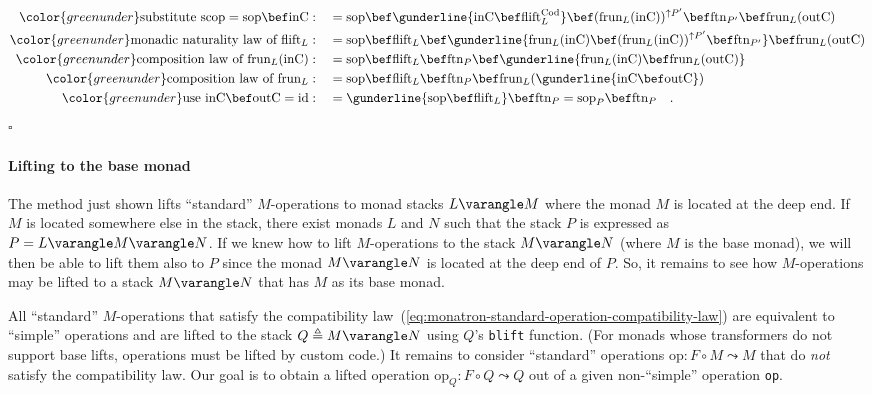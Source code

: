 \begin{align*}
{\color{greenunder}\text{substitute }\text{scop}=\text{sop}\bef\text{inC}:}\quad & =\text{sop}\bef\gunderline{\text{inC}\bef\text{flift}_{L}^{\text{Cod}}}\bef(\text{frun}_{L}(\text{inC}))^{\uparrow P^{\prime}}\bef\text{ftn}_{P^{\prime}}\bef\text{frun}_{L}(\text{outC})\\
{\color{greenunder}\text{monadic naturality law of }\text{flift}_{L}:}\quad & =\text{sop}\bef\text{flift}_{L}\bef\gunderline{\text{frun}_{L}(\text{inC})\bef(\text{frun}_{L}(\text{inC}))^{\uparrow P^{\prime}}\bef\text{ftn}_{P^{\prime}}}\bef\text{frun}_{L}(\text{outC})\\
{\color{greenunder}\text{composition law of }\text{frun}_{L}(\text{inC}):}\quad & =\text{sop}\bef\text{flift}_{L}\bef\text{ftn}_{P}\bef\gunderline{\text{frun}_{L}(\text{inC})\bef\text{frun}_{L}(\text{outC})}\\
{\color{greenunder}\text{composition law of }\text{frun}_{L}:}\quad & =\text{sop}\bef\text{flift}_{L}\bef\text{ftn}_{P}\bef\text{frun}_{L}(\gunderline{\text{inC}\bef\text{outC}})\\
{\color{greenunder}\text{use }\text{inC}\bef\text{outC}=\text{id}:}\quad & =\gunderline{\text{sop}\bef\text{flift}_{L}}\bef\text{ftn}_{P}=\text{sop}_{P}\bef\text{ftn}_{P}\quad.
\end{align*}
$\square$

\paragraph{Lifting to the base monad}

The method just shown lifts \textsf{``}standard\textsf{''} $M$-operations to monad
stacks $L\varangle M$ where the monad $M$ is located at the deep
end. If $M$ is located somewhere else in the stack, there exist monads
$L$ and $N$ such that the stack $P$ is expressed as $P=L\varangle M\varangle N$.
If we knew how to lift $M$-operations to the stack $M\varangle N$
(where $M$ is the base monad), we will then be able to lift them
also to $P$ since the monad $M\varangle N$ is located at the deep
end of $P$. So, it remains to see how $M$-operations may be lifted
to a stack $M\varangle N$ that has $M$ as its base monad.

All \textsf{``}standard\textsf{''} $M$-operations that satisfy the compatibility
law~(\ref{eq:monatron-standard-operation-compatibility-law}) are
equivalent to \textsf{``}simple\textsf{''} operations and are lifted to the stack
$Q\triangleq M\varangle N$ using $Q$\textsf{'}s \lstinline!blift! function.
(For monads whose transformers do not support base lifts, operations
must be lifted by custom code.) It remains to consider \textsf{``}standard\textsf{''}
operations $\text{op}:F\circ M\leadsto M$ that do \emph{not} satisfy
the compatibility law. Our goal is to obtain a lifted operation $\text{op}_{Q}:F\circ Q\leadsto Q$
out of a given non-\textsf{``}simple\textsf{''} operation \lstinline!op!.

